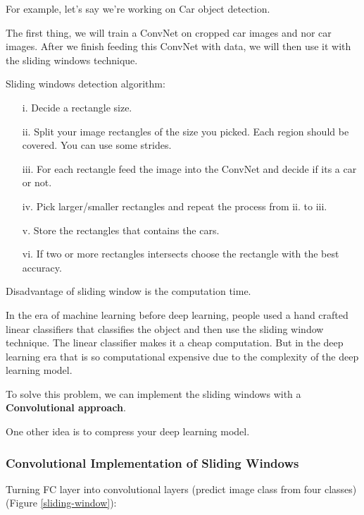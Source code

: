 For example, let's say we're working on Car object detection.

The first thing, we will train a ConvNet on cropped car images and nor car images. After we finish feeding this ConvNet with data, we will then use it with the sliding windows technique.


Sliding windows detection algorithm:
\begin{itemize}
    \item[i.] Decide a rectangle size.
    \item[ii.] Split your image rectangles of the size you picked. Each region should be covered. You can use some strides.
    \item[iii.] For each rectangle feed the image into the ConvNet and decide if its a car or not.
    \item[iv.] Pick larger/smaller rectangles and repeat the process from ii. to iii.
    \item[v.] Store the rectangles that contains the cars.
    \item[vi.] If two or more rectangles intersects choose the rectangle with the best accuracy.
\end{itemize}

Disadvantage of sliding window is the computation time.

In the era of machine learning before deep learning, people used a hand crafted linear classifiers that classifies the object and then use the sliding window technique. The linear classifier makes it a cheap computation. But in the deep learning era that is so computational expensive due to the complexity of the deep learning model.

To solve this problem, we can implement the sliding windows with a \textbf{Convolutional approach}.

One other idea is to compress your deep learning model.

\subsubsection{Convolutional Implementation of Sliding Windows}
Turning FC layer into convolutional layers (predict image class from four classes) (Figure \ref{sliding-window}):

